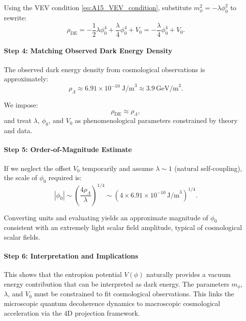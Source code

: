 \documentclass[12pt]{article}
\begin{document}
Using the VEV condition \eqref{eq:A15_VEV_condition}, substitute \( m_\phi^2 = - \lambda \phi_0^2 \) to rewrite:
\[
\rho_{\text{DE}} = -\frac{1}{2} \lambda \phi_0^4 + \frac{\lambda}{4} \phi_0^4 + V_0 = -\frac{\lambda}{4} \phi_0^4 + V_0.
\]

\vspace{1em}
\noindent
\paragraph{Step 4: Matching Observed Dark Energy Density}

The observed dark energy density from cosmological observations is approximately:
\[
\rho_{\Lambda} \approx 6.91 \times 10^{-10} \; \text{J/m}^3 \approx 3.9 \, \text{GeV/m}^3.
\]

We impose:
\begin{equation}
\rho_{\text{DE}} \approx \rho_\Lambda,
\label{eq:A15_matching}
\end{equation}
and treat \(\lambda\), \(\phi_0\), and \(V_0\) as phenomenological parameters constrained by theory and data.

\vspace{1em}
\noindent
\paragraph{Step 5: Order-of-Magnitude Estimate}

If we neglect the offset \(V_0\) temporarily and assume \(\lambda \sim 1\) (natural self-coupling), the scale of \(\phi_0\) required is:
\[
|\phi_0| \sim \left( \frac{4 \rho_\Lambda}{\lambda} \right)^{1/4} \sim (4 \times 6.91 \times 10^{-10} \, \text{J/m}^3)^{1/4}.
\]

Converting units and evaluating yields an approximate magnitude of \(\phi_0\) consistent with an extremely light scalar field amplitude, typical of cosmological scalar fields.

\vspace{1em}
\noindent
\paragraph{Step 6: Interpretation and Implications}

This shows that the entropion potential \(V(\phi)\) naturally provides a vacuum energy contribution that can be interpreted as dark energy. The parameters \(m_\phi\), \(\lambda\), and \(V_0\) must be constrained to fit cosmological observations. This links the microscopic quantum decoherence dynamics to macroscopic cosmological acceleration via the 4D projection framework.
\end{document}

